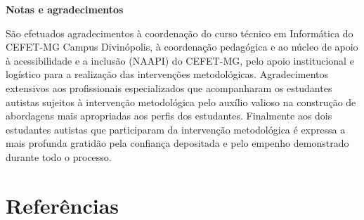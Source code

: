 \documentclass[
  12pt,
  a4paper,
]{article}
\begin{document}
\textbf{Notas e agradecimentos}

São efetuados agradecimentos à coordenação do curso técnico em
Informática do CEFET-MG Campus Divinópolis, à coordenação pedagógica e
ao núcleo de apoio à acessibilidade e a inclusão (NAAPI) do CEFET-MG,
pelo apoio institucional e logístico para a realização das intervenções
metodológicas. Agradecimentos extensivos aos profissionais
especializados que acompanharam os estudantes autistas sujeitos à
intervenção metodológica pelo auxílio valioso na construção de
abordagens mais apropriadas aos perfis dos estudantes. Finalmente aos
dois estudantes autistas que participaram da intervenção metodológica é
expressa a mais profunda gratidão pela confiança depositada e pelo
empenho demonstrado durante todo o processo.

\section*{Referências}\label{bibliography}
\end{document}
